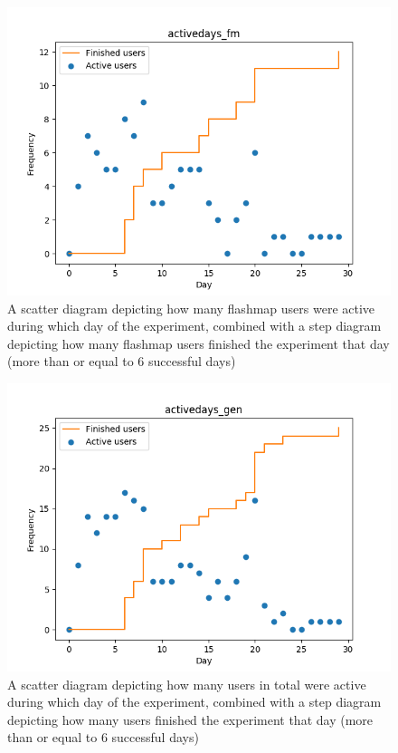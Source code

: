\begin{figure}
    \centering
    \includegraphics[width=.7\textwidth]{img/activedays_fm.png}
    \caption{A scatter diagram depicting how many flashmap users were active during which day of the experiment, combined with a step diagram depicting how many flashmap users finished the experiment that day (more than or equal to 6 successful days)}
    \label{fig:activedays_fm}
\end{figure}
\begin{figure}
    \centering
    \includegraphics[width=.7\textwidth]{img/activedays_gen.png}
    \caption{A scatter diagram depicting how many users in total were active during which day of the experiment, combined with a step diagram depicting how many users finished the experiment that day (more than or equal to 6 successful days)}
    \label{fig:activedays_gen}
\end{figure}
